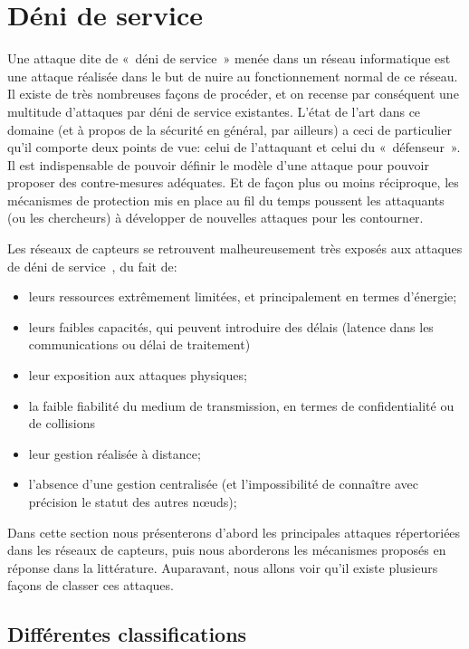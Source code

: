 \section{Déni de service}\label{ea:sec:dos}

Une attaque dite de « déni de service » menée dans un réseau informatique est une attaque réalisée dans le but de nuire au fonctionnement normal de ce réseau.
Il existe de très nombreuses façons de procéder, et on recense par conséquent une multitude d'attaques par déni de service existantes.
L'état de l'art dans ce domaine (et à propos de la sécurité en général, par ailleurs) a ceci de particulier qu'il comporte deux points de vue: celui de l'attaquant et celui du « défenseur ».
Il est indispensable de pouvoir définir le modèle d'une attaque pour pouvoir proposer des contre-mesures adéquates.
Et de façon plus ou moins réciproque, les mécanismes de protection mis en place au fil du temps poussent les attaquants (ou les chercheurs) à développer de nouvelles attaques pour les contourner.

Les réseaux de capteurs se retrouvent malheureusement très exposés aux attaques de déni de service~\cite{RM11}, du fait de:
\begin{itemize}
    \item leurs ressources extrêmement limitées, et principalement en termes d'énergie;
    \item leurs faibles capacités, qui peuvent introduire des délais (latence dans les communications ou délai de traitement)
    \item leur exposition aux attaques physiques;
    \item la faible fiabilité du medium de transmission, en termes de confidentialité ou de collisions
    \item leur gestion réalisée à distance;
    \item l'absence d'une gestion centralisée (et l'impossibilité de connaître avec précision le statut des autres nœuds);
\end{itemize}

Dans cette section nous présenterons d'abord les principales attaques répertoriées dans les réseaux de capteurs, puis nous aborderons les mécanismes proposés en réponse dans la littérature.
Auparavant, nous allons voir qu'il existe plusieurs façons de classer ces attaques.

\subsection{Différentes classifications}

